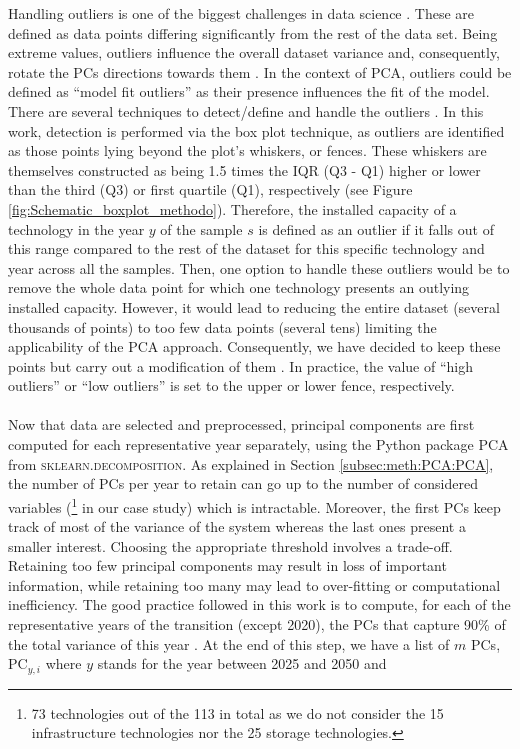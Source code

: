 \noindent
Handling outliers is one of the biggest challenges in data science \cite{aguinis2013best}. These are defined as data points differing significantly from the rest of the data set. Being extreme values, outliers influence the overall dataset variance and, consequently, rotate the PCs directions towards them \cite{stanimirova2007dealing}. In the context of \gls{PCA}, outliers could be defined as ``model fit outliers'' as their presence influences the fit of the model. There are several techniques to detect/define and handle the outliers \cite{aguinis2013best}. In this work, detection is performed via the box plot technique, as outliers are identified as those points lying beyond the plot’s whiskers, or fences. These whiskers are themselves constructed as being 1.5 times the \gls{IQR} (Q3 - Q1) higher or lower than the third (Q3) or first quartile (Q1), respectively (see Figure \ref{fig:Schematic_boxplot_methodo}). Therefore, the installed capacity of a technology in the year $y$ of the sample $s$ is defined as an outlier if it falls out of this range compared to the rest of the dataset for this specific technology and year across all the samples. Then, one option to handle these outliers would be to remove the whole data point for which one technology presents an outlying installed capacity. However, it would lead to reducing the entire dataset (\ie several thousands of points) to too few data points (\ie several tens) limiting the applicability of the \gls{PCA} approach. Consequently, we have decided to keep these points but carry out a modification of them \cite{aguinis2013best}. In practice,  the value of ``high outliers'' or ``low outliers'' is set to the upper or lower fence, respectively.\\

\\

\noindent
Now that data are selected and preprocessed, principal components are first computed for each representative year separately, using the Python package \textsc{PCA} from \textsc{sklearn.decomposition}. As explained in Section \ref{subsec:meth:PCA:PCA}, the number of PCs per year to retain can go up to the number of considered variables (\footnote{73 technologies out of the 113 in total as we do not consider the 15 infrastructure technologies nor the 25 storage technologies.} in our case study) which is intractable. Moreover, the first PCs keep track of most of the variance of the system whereas the last ones present a smaller interest. Choosing the appropriate threshold involves a trade-off. Retaining too few principal components may result in loss of important information, while retaining too many may lead to over-fitting or computational inefficiency. The good practice followed in this work is to compute, for each of the representative years of the transition (except 2020),  the PCs that capture 90\% of the total variance of this year \cite{jolliffe2002principal}. At the end of this step, we have a list of $m$ PCs, \ie $\text{PC}_{y,i}$ where $y$ stands for the year between 2025 and 2050 and 

